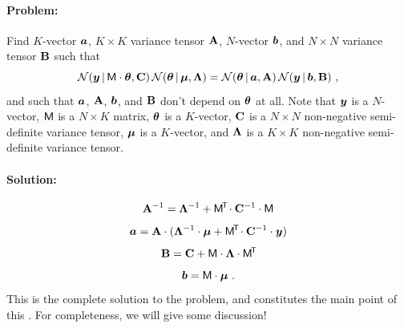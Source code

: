 \paragraph{Problem:}
Find $K$-vector $\boldsymbol{a}$, $K\times K$ variance tensor $\mathbf{A}$, $N$-vector $\boldsymbol{b}$,
and $N\times N$ variance tensor $\mathbf{B}$ such that
\begin{equation}\label{eq:problem}
\mathcal{N}\!\,(\boldsymbol{y}\,|\,\mathsf{M}\cdot\boldsymbol{\theta},\mathbf{C})\,\mathcal{N}\!\,(\boldsymbol{\theta}\,|\,\boldsymbol{\mu},\mathbf{\Lambda})
 = \mathcal{N}\!\,(\boldsymbol{\theta}\,|\,\boldsymbol{a},\mathbf{A})\,\mathcal{N}\!\,(\boldsymbol{y}\,|\,\boldsymbol{b},\mathbf{B}) ~ ,
\end{equation}
and such that $\boldsymbol{a}$, $\mathbf{A}$, $\boldsymbol{b}$, and $\mathbf{B}$ don't depend on $\boldsymbol{\theta}$ at all.
Note that
$\boldsymbol{y}$ is a $N$-vector,
$\mathsf{M}$ is a $N\times K$ matrix,
$\boldsymbol{\theta}$ is a $K$-vector,
$\mathbf{C}$ is a $N\times N$ non-negative semi-definite variance tensor,
$\boldsymbol{\mu}$ is a $K$-vector,
and
$\mathbf{\Lambda}$ is a $K\times K$ non-negative semi-definite variance tensor.

\paragraph{Solution:}
\begin{equation}\label{eq:A}
\mathbf{A}^{-1} = \mathbf{\Lambda}^{-1} + \mathsf{M}^{\!\mathsf{T}\!} \cdot \mathbf{C}^{-1} \cdot \mathsf{M}
\end{equation}
\begin{equation}\label{eq:a}
\boldsymbol{a} = \mathbf{A} \cdot (\mathbf{\Lambda}^{-1} \cdot \boldsymbol{\mu} + \mathsf{M}^{\!\mathsf{T}\!} \cdot \mathbf{C}^{-1} \cdot \boldsymbol{y})
\end{equation}
\begin{equation}\label{eq:B}
\mathbf{B} = \mathbf{C} + \mathsf{M} \cdot \mathbf{\Lambda} \cdot \mathsf{M}^{\!\mathsf{T}\!}
\end{equation}
\begin{equation}\label{eq:b}
\boldsymbol{b} = \mathsf{M} \cdot \boldsymbol{\mu}
~ .
\end{equation}
This is the complete solution to the problem, and constitutes the main point
of this \documentname.
For completeness, we will give some discussion!

